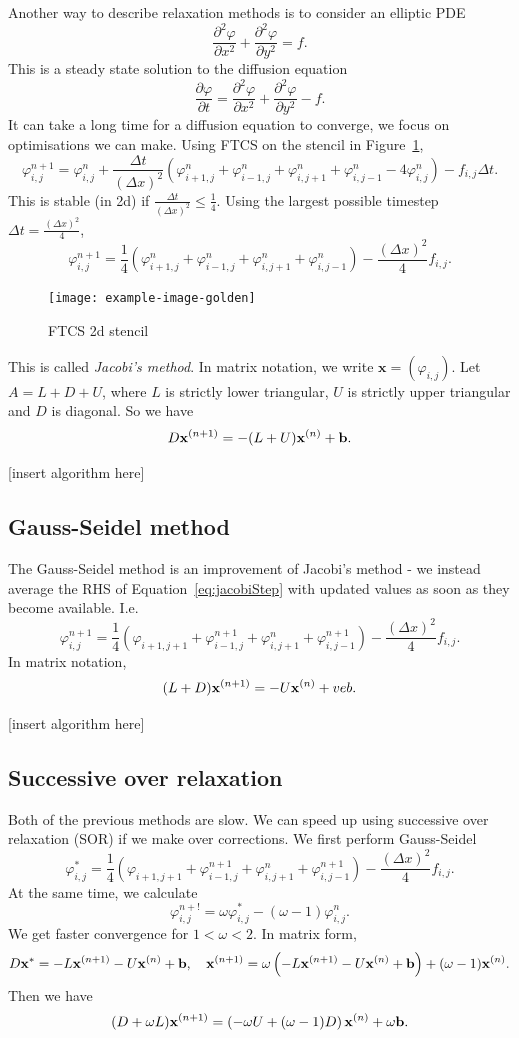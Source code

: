 \documentclass[11pt, a4paper]{article}
\renewcommand{\phi}{\varphi}
\theoremstyle{break}
\newcommand*{\Paren}[1]{\left(#1\right)}%
\newcommand{\ve}{\mathbf} %
\newcommand{\dt}{\Delta t}
\newcommand{\dx}{\Delta x}
\newcommand{\der}[2]{\frac{\partial #1}{\partial #2}}
\newcommand{\pder}[3][2]{\frac{\partial^#1 #2}{\partial #3^#1}}
\begin{document}
Another way to describe relaxation methods is to consider an elliptic PDE \[\pder\phi x+\pder\phi y=f.\] This is a steady state solution to the diffusion equation \[\der\phi t=\pder\phi x+\pder\phi y - f.\]
It can take a long time for a diffusion equation to converge, we focus on optimisations we can make. Using FTCS on the stencil in Figure~\ref{fig:FTCS2dStencil}, \[\phi_{i,j}^{n+1}=\phi^n_{i,j}+\frac{\dt}{(\dx)^2}\Paren{\phi_{i+1,j}^n+\phi_{i-1,j}^n+\phi_{i,j+1}^n+\phi_{i,j-1}^n-4\phi^n_{i,j}}-f_{i,j}\dt.\] This is stable (in 2d) if $\frac{\dt}{(\dx)^2}\leq \frac14$. Using the largest possible timestep $\dt = \frac{(\dx)^2}{4}$, \begin{equation}\label{eq:jacobiStep}\phi_{i,j}^{n+1}=\frac{1}{4}\Paren{\phi_{i+1,j}^n+\phi_{i-1,j}^n+\phi_{i,j+1}^n+\phi_{i,j-1}^n}-\frac{(\dx)^2}{4}f_{i,j}.\end{equation}

\begin{figure}\centering
	\texttt{[image: example-image-golden]}
	\caption{FTCS 2d stencil}\label{fig:FTCS2dStencil}
\end{figure}

This is called \emph{Jacobi's method}. In matrix notation, we write $\ve x = (\phi_{i,j})$. Let $A=L+D+U$, where $L$ is strictly lower triangular, $U$ is strictly upper triangular and $D$ is diagonal. So we have \[D\xx{n+1}=-(L+U)\xx{n}+\ve b.\]

[insert algorithm here]

\subsection{Gauss-Seidel method}
The Gauss-Seidel method is an improvement of Jacobi's method - we instead average the RHS of Equation~\ref{eq:jacobiStep} with updated values as soon as they become available. I.e. \[\phi_{i,j}^{n+1}=\frac14\Paren{\phi_{i+1,j+1}+\phi_{i-1,j}^{n+1}+\phi_{i,j+1}^n+\phi_{i,j-1}^{n+1}}-\frac{(\dx)^2}{4}f_{i,j}.\] In matrix notation, \[(L+D)\xx{n+1}=-U\xx n +ve b.\]

[insert algorithm here]

\subsection{Successive over relaxation}
Both of the previous methods are slow. We can speed up using successive over relaxation (SOR) if we make over corrections. We first perform Gauss-Seidel \[\phi_{i,j}^{*}=\frac14\Paren{\phi_{i+1,j+1}+\phi_{i-1,j}^{n+1}+\phi_{i,j+1}^n+\phi_{i,j-1}^{n+1}}-\frac{(\dx)^2}{4}f_{i,j}.\]
At the same time, we calculate \[\phi_{i,j}^{n+!}=\omega \phi_{i,j}^* - (\omega-1)\phi_{i,j}^n.\] We get faster convergence for $1<\omega<2$. In matrix form, \[D\ve x^*=-L\xx{n+1}-U\xx n+\ve b,\quad \xx{n+1}=\omega\Paren{-L\xx{n+1}-U\xx{n}+\ve b}+(\omega - 1)\xx n.\] Then we have \[ (D+\omega L)\xx{n+1}=\Paren{-\omega U+(\omega -1)D}\xx n +\omega\ve b.\]
\end{document}
